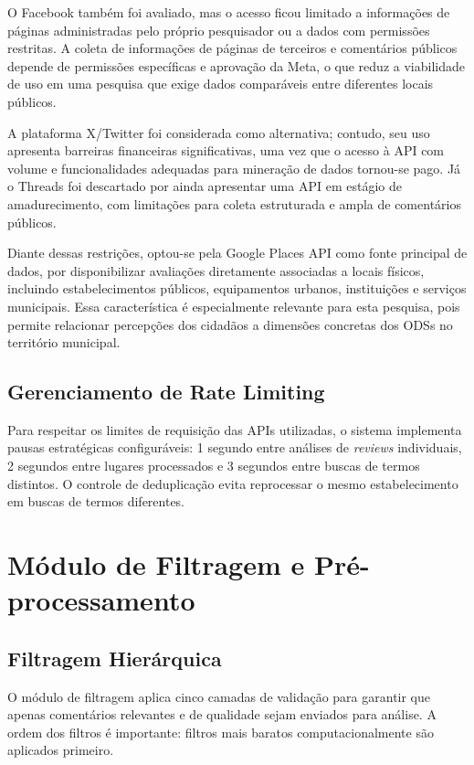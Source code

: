 O Facebook também foi avaliado, mas o acesso ficou limitado a informações de páginas administradas pelo próprio pesquisador ou a dados com permissões restritas. A coleta de informações de páginas de terceiros e comentários públicos depende de permissões específicas e aprovação da Meta, o que reduz a viabilidade de uso em uma pesquisa que exige dados comparáveis entre diferentes locais públicos.

A plataforma X/Twitter foi considerada como alternativa; contudo, seu uso apresenta barreiras financeiras significativas, uma vez que o acesso à API com volume e funcionalidades adequadas para mineração de dados tornou-se pago. Já o Threads foi descartado por ainda apresentar uma API em estágio de amadurecimento, com limitações para coleta estruturada e ampla de comentários públicos.

Diante dessas restrições, optou-se pela Google Places API como fonte principal de dados, por disponibilizar avaliações diretamente associadas a locais físicos, incluindo estabelecimentos públicos, equipamentos urbanos, instituições e serviços municipais. Essa característica é especialmente relevante para esta pesquisa, pois permite relacionar percepções dos cidadãos a dimensões concretas dos \glspl{ODS} no território municipal.

\subsection{Gerenciamento de Rate Limiting}
\label{subsec:rate-limit}

Para respeitar os limites de requisição das APIs utilizadas, o sistema implementa pausas estratégicas configuráveis: 1 segundo entre análises de \textit{reviews} individuais, 2 segundos entre lugares processados e 3 segundos entre buscas de termos distintos. O controle de deduplicação evita reprocessar o mesmo estabelecimento em buscas de termos diferentes.

\section{Módulo de Filtragem e Pré-processamento}
\label{sec:filtragem}

\subsection{Filtragem Hierárquica}
\label{subsec:filtros}

O módulo de filtragem aplica cinco camadas de validação para garantir que apenas comentários relevantes e de qualidade sejam enviados para análise. A ordem dos filtros é importante: filtros mais baratos computacionalmente são aplicados primeiro.

